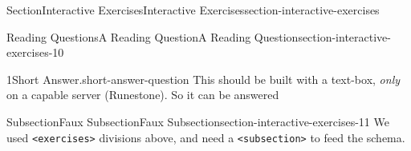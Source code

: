 \documentclass[twoside,10pt,]{article}
\newcommand{\mono}[1]{\texttt{#1}}
\numberwithin{equation}{section}
\begin{document}
\begin{sectionptx}{Section}{Interactive Exercises}{}{Interactive Exercises}{}{}{section-interactive-exercises}
\typeout{************************************************}
%
\begin{reading-questions-subsection}{Reading Questions}{A Reading Question}{}{A Reading Question}{}{}{section-interactive-exercises-10}
\begin{divisionexercise}{1}{Short Answer.}{}{short-answer-question}%
This should be built with a text-box, \emph{only} on a capable server (Runestone).  So it can be answered%
\end{divisionexercise}%
\end{reading-questions-subsection}
%
%
\typeout{************************************************}
\typeout{************************************************}
%
\begin{subsectionptx}{Subsection}{Faux Subsection}{}{Faux Subsection}{}{}{section-interactive-exercises-11}
We used \mono{<exercises>} divisions above, and need a \mono{<subsection>} to feed the schema.%
\end{subsectionptx}
\end{sectionptx}
%
%
\typeout{************************************************}
\typeout{************************************************}
%
\end{document}
